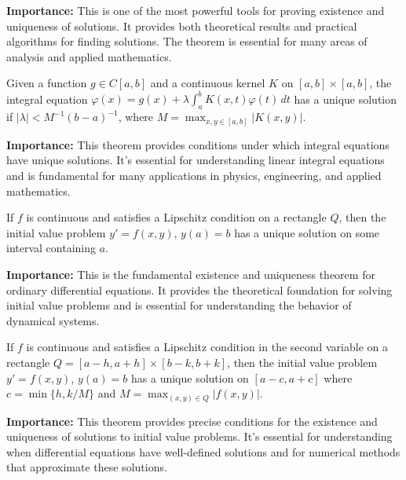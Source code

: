 \noindent\textbf{Importance:} This is one of the most powerful tools for proving existence and uniqueness of solutions. It provides both theoretical results and practical algorithms for finding solutions. The theorem is essential for many areas of analysis and applied mathematics.



\begin{theorem}
Given a function $g \in C[a, b]$ and a continuous kernel $K$ on $[a, b] \times [a, b]$, the integral equation $\varphi(x) = g(x) + \lambda \int_a^b K(x, t)\varphi(t) \, dt$ has a unique solution if $|\lambda| < M^{-1}(b-a)^{-1}$, where $M = \max_{x,y \in [a,b]} |K(x,y)|$.
\end{theorem}

\noindent\textbf{Importance:} This theorem provides conditions under which integral equations have unique solutions. It's essential for understanding linear integral equations and is fundamental for many applications in physics, engineering, and applied mathematics.



\begin{theorem}
If $f$ is continuous and satisfies a Lipschitz condition on a rectangle $Q$, then the initial value problem $y' = f(x, y)$, $y(a) = b$ has a unique solution on some interval containing $a$.
\end{theorem}

\noindent\textbf{Importance:} This is the fundamental existence and uniqueness theorem for ordinary differential equations. It provides the theoretical foundation for solving initial value problems and is essential for understanding the behavior of dynamical systems.



\begin{theorem}
If $f$ is continuous and satisfies a Lipschitz condition in the second variable on a rectangle $Q = [a-h, a+h] \times [b-k, b+k]$, then the initial value problem $y' = f(x, y)$, $y(a) = b$ has a unique solution on $[a-c, a+c]$ where $c = \min\{h, k/M\}$ and $M = \max_{(x,y) \in Q} |f(x,y)|$.
\end{theorem}

\noindent\textbf{Importance:} This theorem provides precise conditions for the existence and uniqueness of solutions to initial value problems. It's essential for understanding when differential equations have well-defined solutions and for numerical methods that approximate these solutions.



